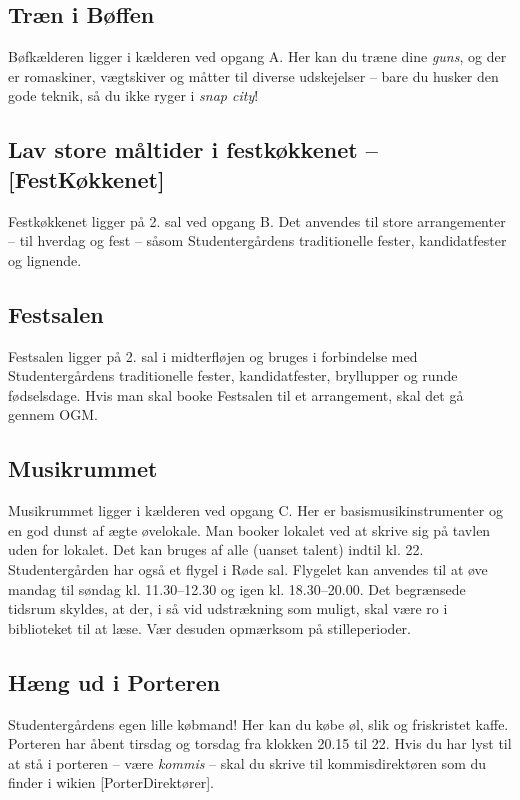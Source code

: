 \documentclass[11pt,article,twoside,openany,danish,extrafontsizes]{memoir} %
\begin{document}
\subsection{Træn i Bøffen}
Bøfkælderen ligger i kælderen ved opgang A. Her kan du træne dine \emph{guns}, og der er romaskiner, vægtskiver og måtter til diverse udskejelser -- bare du husker den gode teknik, så du ikke ryger i \emph{snap city}!


\subsection{Lav store måltider i festkøkkenet -- [FestKøkkenet]}
Festkøkkenet ligger på 2. sal ved opgang B. Det anvendes til store arrangementer -- til hverdag og fest -- såsom Studentergårdens traditionelle fester, kandidatfester og lignende.


\subsection{Festsalen}
Festsalen ligger på 2. sal i midterfløjen og bruges i forbindelse med Studentergårdens traditionelle fester, kandidatfester, bryllupper og runde fødselsdage. Hvis man skal booke Festsalen til et arrangement, skal det gå gennem OGM.


\subsection{Musikrummet}
Musikrummet ligger i kælderen ved opgang C. Her er basismusikinstrumenter og en god dunst af ægte øvelokale. Man booker lokalet ved at skrive sig på tavlen uden for lokalet. Det kan bruges af alle (uanset talent) indtil kl. 22. Studentergården har også et flygel i Røde sal. Flygelet kan anvendes til at øve mandag til søndag kl. 11.30--12.30 og igen kl. 18.30--20.00. Det begrænsede tidsrum skyldes, at der, i så vid udstrækning som muligt, skal være ro i biblioteket til at læse. Vær desuden opmærksom på stilleperioder.


\subsection{Hæng ud i Porteren}
Studentergårdens egen lille købmand! Her kan du købe øl, slik og friskristet kaffe. Porteren har åbent tirsdag og torsdag fra klokken 20.15 til 22. Hvis du har lyst til at stå i porteren -- være \emph{kommis} -- skal du skrive til kommisdirektøren som du finder i wikien [PorterDirektører].
\end{document}
